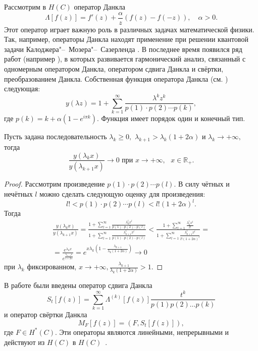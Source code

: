 Рассмотрим в $H(C)$ оператор Данкла 
$$
\Lambda [f(z)]=f'(z)+\frac {\alpha}z(f(z)-f(-z)),\quad  \alpha >0.
$$  
Этот оператор играет важную роль в различных задачах математической физики. Так, например, операторы Данкла находят применение при решении квантовой задачи Калоджера"--~Мозера"--~Сазерленда \cite{zabirova0}. В последнее время появился ряд работ (например \cite{zabirova1}), в которых развивается гармонический анализ, связанный с одномерным оператором Данкла, оператором сдвига Данкла и свёртки, преобразованием Данкла. 
Собственная функция оператора Данкла (см. \cite{zabirova1, zabirova1_1}) следующая: 
$$y(\lambda z)=1+\sum\limits^{\infty}_{k=1} \frac{\lambda^k z^k }{p(1)\cdot p(2)\cdots p(k)},$$ 
где $p(k)=k+\alpha (1-e^{i\pi k})$. Функция имеет порядок один и конечный тип. 

\smallskip

\begin{lemma}[1]Пусть задана последовательность $\lambda_k \ge 0,$ $\lambda_{k+1}>\lambda_{k}(1+2\alpha) $ и $\lambda_k \to+\infty,$ тогда  $$\frac {y(\lambda_kx)}{y(\lambda_{k+1}x)}\to0 \text{  при $x\to+\infty,$ $x\in \mathbb R_+.$}
$$
\end{lemma}



\begin{proof} Рассмотрим произведение $p(1) \cdot p(2)\cdots p(l)$. 
В силу чётных и нечётных $l$ можно сделать следующую оценку для произведения:  
$$l!<p(1)\cdot p(2)\cdots p(l)<l!(1+2\alpha )^l.$$ Тогда 
\begin{multline*}
\frac {y(\lambda_kx)}{y(\lambda_{k+1}x)}= \frac {1+\sum^{\infty}_{l=1} 
\frac{\lambda_k^l x^l }{p(1) \cdot p(2)\cdots p(l)}}{1+\sum^{\infty}_{l=1} 
\frac{\lambda_{k+1}^l x^l }{p(1)\cdot p(2)\cdots p(l)}}< 
\frac {1+\sum^{\infty}_{l=1} \frac{\lambda_k^l x^l }{l!}}{1+\sum^{\infty}_{l=1} \frac{\lambda_{k+1}^l x^l }{l!(1+2\alpha)^l}}= \\ =\frac {e^{\lambda_k x}}{e^{\frac {\lambda_{k+1}x}{1+2\alpha}}}=e^{x\lambda_k (1-\frac {\lambda_{k+1}}{\lambda_k(1+2\alpha)})} \to 0
\end{multline*}
при $\lambda_k$ фиксированном, $x\to +\infty, \frac {\lambda_{k+1}}{\lambda_{k}(1+2\alpha)} >1$. \end{proof}

\smallskip

В работе \cite{zabirova1} были введены оператор сдвига Данкла 
$$
S_t[f(z)]=\sum\limits^{\infty}_{k=1} \Lambda^{(k)}[f(z)]\frac{t^k}{p(1)p(2)\dots p(k)}
$$ и оператор свёртки Данкла 
$$M_F[f(z)]=(F,S_t[f(z)]),$$ 
где $F\in H^*(C)$. Эти операторы являются линейными, непрерывными и действуют из $H(C)$ в $H(C)$~\cite{zabirova1}.   


